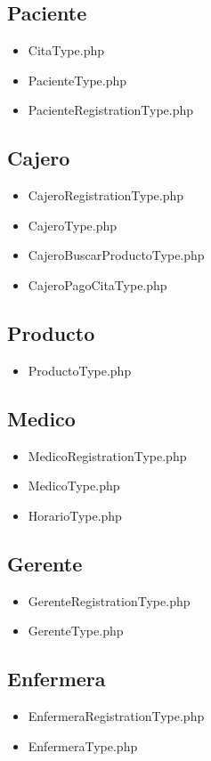 		\subsection{Paciente}
		\begin{itemize}
		\item CitaType.php
		\item PacienteType.php
		\item PacienteRegistrationType.php
		
		\end{itemize}
		\subsection{Cajero}
		\begin{itemize}
		\item CajeroRegistrationType.php
		\item CajeroType.php
		\item CajeroBuscarProductoType.php
		\item CajeroPagoCitaType.php
		\end{itemize}
		\subsection{Producto}
		\begin{itemize}
		\item ProductoType.php
		\end{itemize}
		
		\subsection{Medico}
		\begin{itemize}
		\item MedicoRegistrationType.php
		\item MedicoType.php
		\item HorarioType.php
		\end{itemize}
		
		\subsection{Gerente}
		\begin{itemize}
		\item GerenteRegistrationType.php
		\item GerenteType.php
		\end{itemize}
		
		\subsection{Enfermera}
		\begin{itemize}
		\item EnfermeraRegistrationType.php
		\item EnfermeraType.php
		\end{itemize}
		
